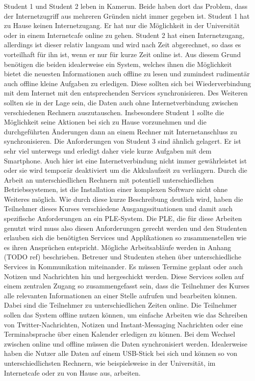 Student 1 und Student 2 leben in Kamerun. Beide haben dort das Problem, dass der Internetzugriff aus mehreren Gründen nicht immer gegeben ist. Student 1 hat zu Hause keinen Internetzugang. Er hat nur die Möglichkeit in der Universität oder in einem Internetcafe online zu gehen. Student 2 hat einen Internetzugang, allerdings ist dieser relativ langsam und wird nach Zeit abgerechnet, so dass es vorteilhaft für ihn ist, wenn er nur für kurze Zeit online ist. Aus diesem Grund benötigen die beiden idealerweise ein System, welches ihnen die Möglichkeit bietet die neuesten Informationen auch offline zu lesen und zumindest rudimentär auch offline kleine Aufgaben zu erledigen. Diese sollten sich bei Wiederverbindung mit dem Internet mit den entsprechenden Services synchronisieren. Des Weiteren sollten sie in der Lage sein, die Daten auch ohne Internetverbindung zwischen verschiedenen Rechnern auszutauschen. Insbesondere Student 1 sollte die Möglichkeit seine Aktionen bei sich zu Hause vorzunehmen und die durchgeführten Änderungen dann an einem Rechner mit Internetanschluss zu synchronisieren. Die Anforderungen von Student 3 sind ähnlich gelagert. Er ist sehr viel unterwegs und erledigt daher viele kurze Aufgaben mit dem Smartphone. Auch hier ist eine Internetverbindung nicht immer gewährleistet ist oder sie wird temporär deaktiviert um die Akkulaufzeit zu verlängern. Durch die Arbeit an unterschiedlichen Rechnern mit potentiell unterschiedlichen Betriebssystemen, ist die Installation einer komplexen Software nicht ohne Weiteres möglich. Wie durch diese kurze Beschreibung deutlich wird, haben die Teilnehmer dieses Kurses verschiedene Ausgangssituationen und damit auch spezifische Anforderungen an ein PLE-System. Die PLE, die für diese Arbeiten genutzt wird muss also diesen Anforderungen gerecht werden und den Studenten erlauben sich die benötigten Services und Applikationen so zusammenstellen wie es ihren Ansprüchen entspricht. Mögliche Arbeitsabläufe werden in Anhang (TODO ref) beschrieben. Betreuer und Studenten stehen über unterschiedliche Services in Kommunikation miteinander. Es müssen Termine geplant oder auch Notizen und Nachrichten hin und hergeschickt werden. Diese Services sollen auf einem zentralen Zugang so zusammengefasst sein, dass die Teilnehmer des Kurses alle relevanten Informationen an einer Stelle aufrufen und bearbeiten können. Dabei sind die Teilnehmer zu unterschiedlichen Zeiten online. Die Teilnehmer sollen das System offline nutzen können, um einfache Arbeiten wie das Schreiben von Twitter-Nachrichten, Notizen und Instant-Messaging Nachrichten oder eine Terminabsprache über einen Kalender erledigen zu können. Bei dem Wechsel zwischen online und offline müssen die Daten synchronisiert werden. Idealerweise haben die Nutzer alle Daten auf einem USB-Stick bei sich und können so von unterschiedlichsten Rechnern, wie beispielsweise in der Universität, im Internetcafe oder zu von Hause aus, arbeiten.

